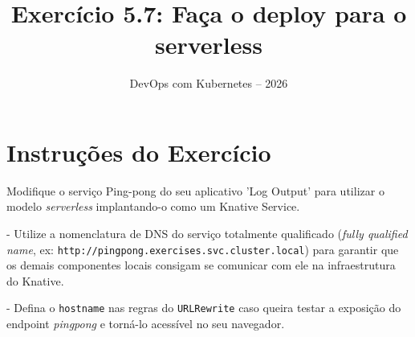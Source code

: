 \documentclass[11pt,a4paper]{article}
\title{\color{secondary}\Huge\textbf{Exercício 5.7: Faça o deploy para o serverless}}
\author{\color{primary}DevOps com Kubernetes -- 2026}
\date{}
\begin{document}
\maketitle

\section*{\color{primary}Instruções do Exercício}
\begin{tcolorbox}[colback=blue!5!white,colframe=blue!75!black,title=Exercício 5.7: Faça o deploy para o serverless]
Modifique o serviço Ping-pong do seu aplicativo 'Log Output' para utilizar o modelo \textit{serverless} implantando-o como um Knative Service.

- Utilize a nomenclatura de DNS do serviço totalmente qualificado (\textit{fully qualified name}, ex: \texttt{http://pingpong.exercises.svc.cluster.local}) para garantir que os demais componentes locais consigam se comunicar com ele na infraestrutura do Knative.

- Defina o \texttt{hostname} nas regras do \texttt{URLRewrite} caso queira testar a exposição do endpoint \textit{pingpong} e torná-lo acessível no seu navegador.
\end{tcolorbox}
\end{document}
